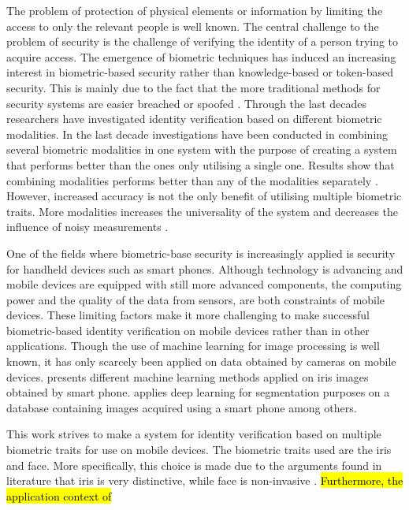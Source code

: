 The problem of protection of physical elements or information by limiting the access to only the relevant people is well known. The central challenge to the problem of security is the challenge of verifying the identity of a person trying to acquire access. The emergence of biometric techniques has induced an increasing interest in biometric-based security rather than knowledge-based or token-based security. This is mainly due to the fact  that the more traditional methods for security systems are easier breached or spoofed \citep{Ross2003}. Through the last decades researchers have investigated identity verification based on different biometric modalities. In the last decade investigations have been conducted in combining several biometric modalities in one system with the purpose of creating a system that performs better than the ones only utilising a single one. Results show that combining modalities performs better than any of the modalities separately \citep{Chen2005a}.  However, increased accuracy is not the only benefit of utilising multiple biometric traits. More modalities increases the universality of the system and decreases the influence of noisy measurements \citep{Ross2003}.

One of the fields where biometric-base security is increasingly applied is security for handheld devices such as smart phones. Although technology is advancing and mobile devices are equipped with still more advanced components, the computing power and the quality of the data from sensors, are both constraints of mobile devices. These limiting factors make it more challenging to make successful biometric-based identity verification on mobile devices rather than in other applications.  Though the use of machine learning for image processing is well known, it has only scarcely been applied on data obtained by cameras on mobile devices. \cite{Khan2017a} presents different machine learning methods applied on iris images obtained by smart phone. \cite{Bazrafkan2017} applies deep learning for segmentation purposes on a database containing images acquired using a smart phone among others. 
 
This work strives to make a system for identity verification based on multiple biometric traits for use on mobile devices. The biometric traits used are the iris and face. More specifically, this choice is made due to the arguments found in literature that iris is very distinctive, while face is non-invasive \citep{Wang2009a}. \hl{Furthermore, the application context of}  